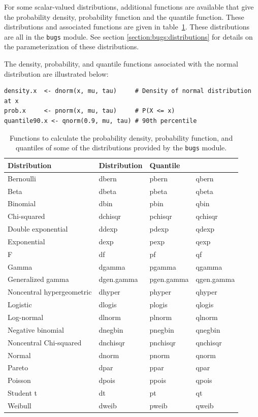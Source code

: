 \documentclass[11pt, a4paper, titlepage]{report}
\begin{document}
For some scalar-valued distributions, additional functions are
available that give the probability density, probability function and
the quantile function. These distributions and associated functions
are given in table~\ref{table:dpq}. These distributions are all in the
\texttt{bugs} module. See section \ref{section:bugs:distributions} for
details on the parameterization of these distributions.

The density, probability, and quantile functions associated with the
normal distribution are illustrated below:
\begin{verbatim}
density.x  <- dnorm(x, mu, tau)     # Density of normal distribution at x
prob.x     <- pnorm(x, mu, tau)     # P(X <= x)
quantile90.x <- qnorm(0.9, mu, tau) # 90th percentile
\end{verbatim}

\begin{table}
\begin{center}
\begin{tabular}{llll}
\hline
Distribution & Distribution & Quantile \\
\hline
Bernoulli          & dbern     & pbern     & qbern \\
Beta               & dbeta     & pbeta     & qbeta \\
Binomial           & dbin      & pbin      & qbin \\
Chi-squared        & dchisqr   & pchisqr   & qchisqr \\
Double exponential & ddexp     & pdexp     & qdexp \\
Exponential        & dexp      & pexp      & qexp \\
F                  & df        & pf        & qf \\
Gamma              & dgamma    & pgamma    & qgamma \\
Generalized gamma  & dgen.gamma & pgen.gamma & qgen.gamma \\
Noncentral hypergeometric     & dhyper    & phyper    & qhyper \\
Logistic           & dlogis    & plogis    & qlogis \\
Log-normal         & dlnorm    & plnorm    & qlnorm \\
Negative binomial  & dnegbin   & pnegbin   & qnegbin \\
Noncentral Chi-squared & dnchisqr   & pnchisqr   & qnchisqr \\
Normal             & dnorm     & pnorm     & qnorm \\
Pareto             & dpar      & ppar      & qpar \\
Poisson            & dpois     & ppois     & qpois \\
Student t          & dt        & pt        & qt \\
Weibull            & dweib     & pweib     & qweib \\
\hline
\end{tabular}
\caption{Functions to calculate the probability density, probability
  function, and quantiles of some of the distributions provided by the
  \texttt{bugs} module. \label{table:dpq}}
\end{center}
\end{table}
\end{document}
